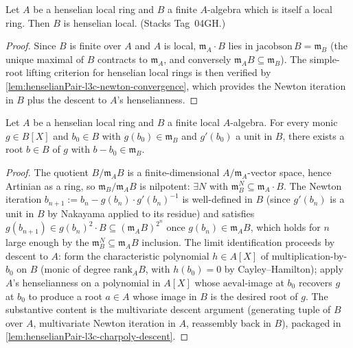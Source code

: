 \begin{lemma}
\label{lem:henselianPair-l3c-finite-henselian}
Let $A$ be a henselian local ring and $B$ a finite $A$-algebra
which is itself a local ring. Then $B$ is henselian local. (Stacks
Tag~04GH.)
\end{lemma}

\begin{proof}

\leanok
Since $B$ is finite over $A$ and $A$ is local, $\mathfrak m_A\cdot
B$ lies in $\mathrm{jacobson}\,B = \mathfrak m_B$ (the unique
maximal of $B$ contracts to $\mathfrak m_A$, and conversely
$\mathfrak m_A B \subseteq \mathfrak m_B$). The simple-root
lifting criterion for henselian local rings is then verified by
\cref{lem:henselianPair-l3c-newton-convergence}, which provides
the Newton iteration in $B$ plus the descent to $A$'s
henselianness.
\end{proof}

\begin{lemma}

\label{lem:henselianPair-l3c-newton-convergence}
Let $A$ be a henselian local ring and $B$ a finite local
$A$-algebra. For every monic $g \in B[X]$ and $b_0 \in B$ with
$g(b_0) \in \mathfrak m_B$ and $g'(b_0)$ a unit in $B$, there
exists a root $b \in B$ of $g$ with $b - b_0 \in \mathfrak m_B$.
\end{lemma}

\begin{proof}

\leanok
The quotient $B/\mathfrak m_A B$ is a finite-dimensional
$A/\mathfrak m_A$-vector space, hence Artinian as a ring, so
$\mathfrak m_B/\mathfrak m_A B$ is nilpotent: $\exists N$ with
$\mathfrak m_B^{N} \subseteq \mathfrak m_A \cdot B$. The Newton
iteration $b_{n+1} := b_n - g(b_n) \cdot g'(b_n)^{-1}$ is
well-defined in $B$ (since $g'(b_n)$ is a unit in $B$ by Nakayama
applied to its residue) and satisfies $g(b_{n+1}) \in g(b_n)^2
\cdot B \subseteq (\mathfrak m_A B)^{2^n}$ once $g(b_n) \in
\mathfrak m_A B$, which holds for $n$ large enough by the
$\mathfrak m_B^N \subseteq \mathfrak m_A B$ inclusion. The limit
identification proceeds by descent to $A$: form the
characteristic polynomial $h \in A[X]$ of multiplication-by-$b_0$
on $B$ (monic of degree $\mathrm{rank}_A B$, with $h(b_0) = 0$ by
Cayley--Hamilton); apply $A$'s henselianness on a polynomial in
$A[X]$ whose $\mathrm{aeval}$-image at $b_0$ recovers $g$ at
$b_0$ to produce a root $a \in A$ whose image in $B$ is the
desired root of $g$. The substantive content is the multivariate
descent argument (generating tuple of $B$ over $A$, multivariate
Newton iteration in $A$, reassembly back in $B$), packaged in
\cref{lem:henselianPair-l3c-charpoly-descent}.
\end{proof}

